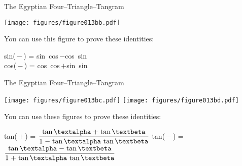 \documentclass[14pt]{beamer}
\begin{document}
    \begin{frame}{The Egyptian Four--Triangle--Tangram}
        \begin{center}
            \texttt{[image: figures/figure013bb.pdf]}

            \bigskip
            You can use this figure to prove these identities:
            \bigskip

            {\small sin(\textalpha\,$-$\,\textbeta) = sin\,\textalpha\,\,cos\,\textbeta\;$-$\;cos\,\textalpha\,\,sin\,\textbeta\\[1ex]
            cos(\textalpha\,$-$\,\textbeta) = cos\,\textalpha\,\,cos\,\textbeta\;$+$\;sin\,\textalpha\,\,sin\,\textbeta\;}
        \end{center}
    \end{frame}


    \begin{frame}{The Egyptian Four--Triangle--Tangram}
        \begin{center}
            \texttt{[image: figures/figure013bc.pdf]}\qquad
            \texttt{[image: figures/figure013bd.pdf]}

            \bigskip
            You can use these figures to prove these identities:
            \bigskip

            {\footnotesize tan(\textalpha\,$+$\,\textbeta) = $\displaystyle\frac{\text{tan\,\textalpha\;$+$\;tan\,\textbeta}}{\text{1\;$-$\;tan\,\textalpha\,\,tan\,\textbeta}}$\qquad
            tan(\textalpha\,$-$\,\textbeta) = $\displaystyle\frac{\text{tan\,\textalpha\;$-$\;tan\,\textbeta}}{\text{1\;$+$\;tan\,\textalpha\,\,tan\,\textbeta}}$\\[5ex]}
        \end{center}
    \end{frame}

\end{document}
